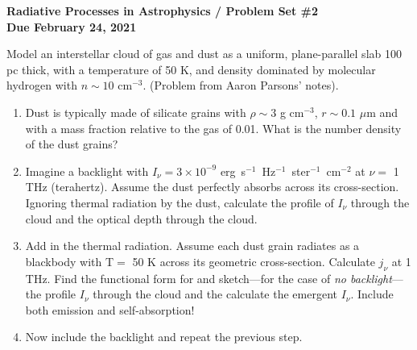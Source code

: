 \documentclass[11pt, preprint]{article}
\begin{document}
\begin{center}
  {\bf Radiative Processes in Astrophysics / Problem Set \#2 \\
    Due February 24, 2021}
\end{center}


\noindent Model an interstellar cloud of gas and dust as a uniform,
  plane-parallel slab 100 pc thick, with a temperature of 50 K, and
  density dominated by molecular hydrogen with $n \sim 10$
  cm$^{-3}$. (Problem from Aaron Parsons' notes).
\begin{enumerate}
\item Dust is typically made of silicate grains with $\rho \sim 3$ g
  cm$^{-3}$, $r\sim 0.1$ $\mu$m and with a mass fraction relative to
  the gas of 0.01. What is the number density of the dust grains?
\item Imagine a backlight with $I_\nu = 3\times 10^{-9}$
  erg~s$^{-1}$~Hz$^{-1}$~ster$^{-1}$~cm$^{-2}$ at $\nu =$ 1 THz
  (terahertz). Assume the dust perfectly absorbs across its
  cross-section. Ignoring thermal radiation by the dust, calculate
  the profile of $I_\nu$ through the cloud and the optical depth
  through the cloud.
\item Add in the thermal radiation. Assume each dust grain radiates
  as a blackbody  with T$=$ 50 K across its geometric
  cross-section. Calculate $j_\nu$ at 1 THz. Find the functional form
  for and sketch---for the case of {\it no backlight}---the 
  profile $I_\nu$ through the cloud and the calculate the emergent
  $I_\nu$. Include both emission and self-absorption!
\item Now include the backlight and repeat the previous step.
\end{enumerate}
\end{document}
